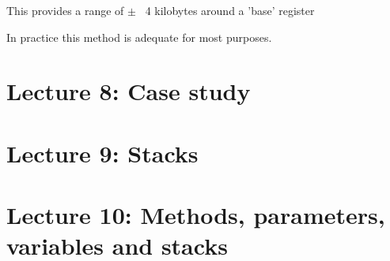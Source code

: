 \documentclass{article}
\begin{document}
This provides a range of $\pm$ ~4 kilobytes around a 'base' register

In practice this method is adequate for most purposes. 

\section{Lecture 8: Case study}
\section{Lecture 9: Stacks}
\section{Lecture 10: Methods, parameters, variables and stacks}
\end{document}
